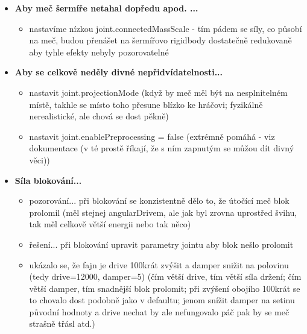 \begin{itemize}
\begin{itemize}
\begin{itemize}
        \end{itemize}
    \end{itemize}
  \item \textbf{Aby meč šermíře netahal dopředu apod. ...}
    \begin{itemize}
      \item nastavíme nízkou joint.connectedMassScale - tím pádem se síly, co působí na meč, budou přenášet na šermířovo rigidbody dostatečně redukovaně aby tyhle efekty nebyly pozorovatelné
    \end{itemize}
  \item \textbf{Aby se celkově neděly divné nepřidvídatelnosti...}
      \begin{itemize}
        \item nastavit joint.projectionMode (když by meč měl být na nesplnitelném místě, takhle se místo toho přesune blízko ke hráčovi; fyzikálně nerealistické, ale chová se dost pěkně)
        \item nastavit joint.enablePreprocessing = false (extrémně pomáhá - viz dokumentace (v té prostě říkají, že s ním zapnutým se můžou dít divný věci))
      \end{itemize}
  \item \textbf{Síla blokování...}
    \begin{itemize}
      \item pozorování... při blokování se konzistentně dělo to, že útočící meč blok prolomil (měl stejnej angularDrivem, ale jak byl zrovna uprostřed švihu, tak měl celkově větší energii nebo tak něco)
      \item řešení... při blokování upravit parametry jointu aby blok nešlo prolomit
      \item ukázalo se, že fajn je drive 100krát zvýšit a damper snižit na polovinu (tedy drive=12000, damper=5) (čím větší drive, tím větší síla držení; čím větší damper, tím snadnější blok prolomit; při zvýšení obojího 100krát se to chovalo dost podobně jako v defaultu; jenom snížit damper na setinu původní hodnoty a drive nechat by ale nefungovalo páč pak by se meč strašně třásl atd.)
    \end{itemize}
\end{itemize}

